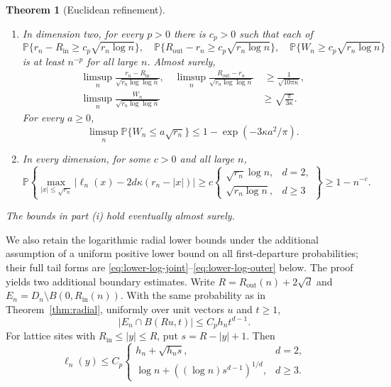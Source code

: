 \documentclass[11pt]{amsart}
\theoremstyle{plain}
\newtheorem{theorem}{Theorem}[section]
\theoremstyle{definition}
\numberwithin{equation}{section}
\renewcommand{\P}{\mathbb P}
\newcommand{\Rin}{R_{\mathrm{in}}}
\newcommand{\Rout}{R_{\mathrm{out}}}
\begin{document}
\begin{theorem}[Euclidean refinement]
\begin{enumerate}[label=\textup{(\roman*)},leftmargin=*]
\item In dimension two, for every $p>0$ there is $c_p>0$ such that
each of
\begin{equation}\label{eq:radial-poly-lower}
 \P\{r_n-\Rin\ge c_p\sqrt{r_n\log n}\},\quad
 \P\{\Rout-r_n\ge c_p\sqrt{r_n\log n}\},\quad
 \P\{W_n\ge c_p\sqrt{r_n\log n}\}
\end{equation}
is at least $n^{-p}$ for all large $n$. Almost surely,
\begin{align}
 \limsup_n\frac{r_n-\Rin}{\sqrt{r_n\log\log n}},\quad
 \limsup_n\frac{\Rout-r_n}{\sqrt{r_n\log\log n}}
 &\ \ge\frac1{\sqrt{10\pi\kappa}},\label{eq:radial-lil-lower}\\
 \limsup_n\frac{W_n}{\sqrt{r_n\log\log n}}
 &\ge\sqrt{\frac\pi{3\kappa}}.\label{eq:radial-width-lil}
\end{align}
For every $a\ge0$,
\begin{equation}\label{eq:radial-smallball}
 \limsup_n\P\{W_n\le a\sqrt{r_n}\}
 \le1-\exp(-3\kappa a^2/\pi).
\end{equation}

\item In every dimension, for some $c>0$ and all large $n$,
\begin{equation}\label{eq:radial-local-lower}
 \P\left\{\max_{|x|\le\sqrt{r_n}}
 |\ell_n(x)-2d\kappa(r_n-|x|)|\ge
 c\begin{cases}\sqrt{r_n}\log n,&d=2,\\
 \sqrt{r_n\log n},&d\ge3
 \end{cases}\right\}\ge1-n^{-c}.
\end{equation}
\end{enumerate}
The bounds in part \textup{(i)} hold eventually almost surely.
\end{theorem}

We also retain the logarithmic radial lower bounds under the additional
assumption of a uniform positive lower bound on all first-departure
probabilities; their full tail forms are
\eqref{eq:lower-log-joint}--\eqref{eq:lower-log-outer} below.
The proof yields two additional boundary estimates. Write
$R=\Rout(n)+2\sqrt d$ and $E_n=D_n\setminus B(0,\Rin(n))$.
With the same probability as in Theorem~\ref{thm:radial}, uniformly
over unit vectors $u$ and $t\ge1$,
\begin{equation}\label{eq:new-caps}
 |E_n\cap B(Ru,t)|\le C_ph_n t^{d-1}.
\end{equation}
For lattice sites with $\Rin\le|y|\le R$, put $s=R-|y|+1$.
Then
\begin{equation}\label{eq:new-boundary}
 \ell_n(y)\le C_p\begin{cases}
 h_n+\sqrt{h_ns},&d=2,\\
 \log n+((\log n)s^{d-1})^{1/d},&d\ge3.
 \end{cases}
\end{equation}
\end{document}
